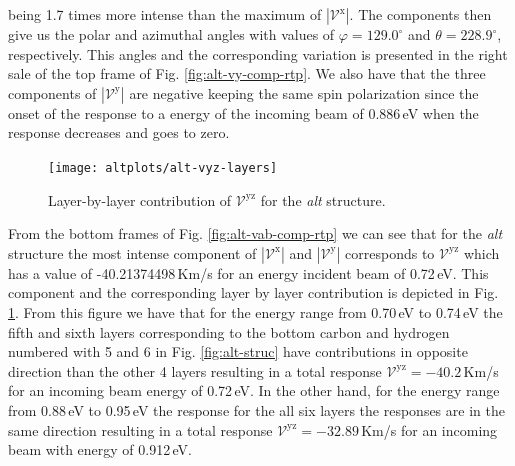 \documentclass[prb,11pt,tightenlines,twocolumn,aps]{revtex4-1}
\begin{document}
being 1.7 times more intense than the maximum of $|\mathcal{V}^{\mathrm{x}}|$.
The components then give us the polar and azimuthal angles with values of
$\varphi=129.0^{\circ}$ and $\theta=228.9^{\circ}$, respectively. This angles
and the corresponding variation is presented in the right sale of the top frame
of Fig. \ref{fig:alt-vy-comp-rtp}.
% 
We also have that the three components of $|\mathcal{V}^{\mathrm{y}}|$ are
negative keeping the same spin polarization since the onset of the response to a
energy of the incoming beam of 0.886\,eV when the response decreases and goes to
zero.
\begin{figure}[tb]
    \centering
    \texttt{[image: altplots/alt-vyz-layers]}
    \caption{Layer-by-layer contribution of $\mathcal{V}^{\mathrm{yz}}$ for the
     \emph{alt} structure.}
    \label{fig:alt-vyz-lay}
\end{figure}
From the bottom frames of Fig. \ref{fig:alt-vab-comp-rtp} we can see that for
the \emph{alt} structure the most intense component of
$|\mathcal{V}^{\mathrm{x}}|$ and $|\mathcal{V}^{\mathrm{y}}|$ corresponds to
$\mathcal{V}^{\mathrm{yz}}$ which has a value of -40.21374498\,Km/s for an
energy incident beam of 0.72\,eV. This component and the corresponding layer by
layer contribution is depicted in Fig. \ref{fig:alt-vyz-lay}. From this figure
we have that for the energy range from 0.70\,eV to 0.74\,eV the fifth and sixth
layers corresponding to the bottom carbon and hydrogen numbered with 5 and 6 in
Fig. \ref{fig:alt-struc} have contributions in opposite direction than the other
4 layers resulting in a total response $\mathcal{V}^{\mathrm{yz}}= -40.2$\,Km/s
for an incoming beam energy of 0.72\,eV. In the other hand, for the energy range
from 0.88\,eV to 0.95\,eV the response for the all six layers the responses are
in the same direction resulting in a total response
$\mathcal{V}^{\mathrm{yz}}=-32.89$\,Km/s for an incoming beam with energy of
0.912\,eV.
\end{document}
